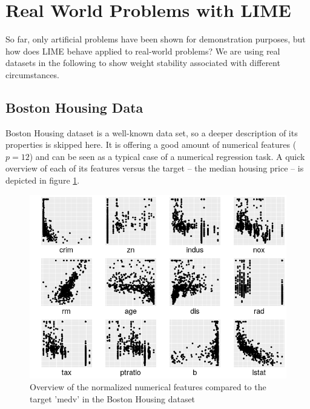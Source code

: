 \documentclass[]{krantz}
\begin{document}
\section{Real World Problems with
LIME}\label{real-world-problems-with-lime}

So far, only artificial problems have been shown for demonstration
purposes, but how does LIME behave applied to real-world problems? We
are using real datasets in the following to show weight stability
associated with different circumstances.

\subsection{Boston Housing Data}\label{boston-housing-data}

Boston Housing dataset is a well-known data set, so a deeper description
of its properties is skipped here. It is offering a good amount of
numerical features (\(p = 12\)) and can be seen as a typical case of a
numerical regression task. A quick overview of each of its features
versus the target -- the median housing price -- is depicted in figure
\ref{fig:figboston}.

\begin{figure}

{\centering \includegraphics[width=0.99\linewidth]{images/boston_prezi} 

}

\caption{Overview of the normalized numerical features compared to the target 'medv' in the Boston Housing dataset}\label{fig:figboston}
\end{figure}
\end{document}

